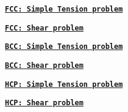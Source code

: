 \href{example_fcc_simpleTension.pdf}{\tt {\bfseries F\-C\-C\-: Simple Tension problem}} \par
 \href{example_fcc_shear.pdf}{\tt {\bfseries F\-C\-C\-: Shear problem}} \par
 \href{example_bcc_simpleTension.pdf}{\tt {\bfseries B\-C\-C\-: Simple Tension problem}} \par
 \href{example_bcc_shear.pdf}{\tt {\bfseries B\-C\-C\-: Shear problem}} \par
 \href{example_hcp_simpleTension.pdf}{\tt {\bfseries H\-C\-P\-: Simple Tension problem}} \par
 \href{example_hcp_shear.pdf}{\tt {\bfseries H\-C\-P\-: Shear problem}} \par
 